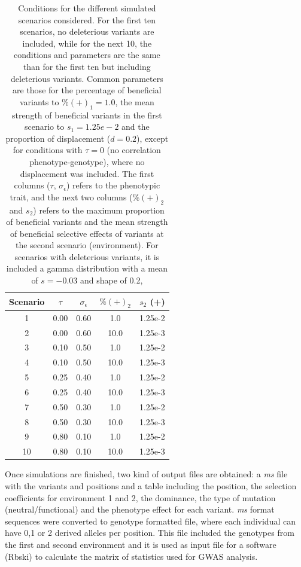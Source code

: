 \documentclass[a4paper,11pt]{article}
\begin{document}
\begin{table}[h]
\begin{center}\begin{tabular}{ccccc}
Scenario & $\tau$ & $\sigma_{\epsilon}$ & $\%(+)_2$ & $s_2$ (+)\\
\hline
1  & 0.00 & 0.60& 1.0   & 1.25e-2 \\
2  & 0.00 & 0.60 & 10.0 & 1.25e-3\\
3  & 0.10 & 0.50 & 1.0   & 1.25e-2\\
4  & 0.10 & 0.50 & 10.0 & 1.25e-3\\
5  & 0.25 & 0.40 & 1.0   & 1.25e-2\\
6  & 0.25 & 0.40 & 10.0 & 1.25e-3\\
7  & 0.50 & 0.30 & 1.0   & 1.25e-2\\
8  & 0.50 & 0.30 & 10.0 & 1.25e-3\\
9  & 0.80 & 0.10 & 1.0   & 1.25e-2\\
10 & 0.80 & 0.10 & 10.0 & 1.25e-3\\
\hline
\end{tabular} 
\caption{Conditions for the different simulated scenarios considered. For the first ten scenarios, no deleterious variants are included, while for the next 10, the conditions and parameters are the same than for the first ten  but including deleterious variants. Common parameters are those for the percentage of beneficial variants to $\%(+)_1=1.0$, the mean strength of beneficial variants in the first scenario to $s_1=1.25e-2$ and the proportion of displacement ($d=0.2$), except for conditions with $\tau=0$ (no correlation phenotype-genotype), where no displacement was included. The first columns ($\tau$, $\sigma_{\epsilon}$) refers to the phenotypic trait, and the next two columns ($\%(+)_2$ and $s_2$) refers to the maximum proportion of beneficial variants and the mean strength of beneficial selective effects of variants at the second scenario (environment). For scenarios with deleterious variants, it is included a gamma distribution with a mean of $s=-0.03$ and shape of 0.2, }
\label{tablescen}
\end{center}
\end{table}

\noindent Once simulations are finished, two kind of  output files are obtained: a \textit{ms} file with the variants and positions and a table including the position, the selection coefficients for environment 1 and 2, the dominance, the type of mutation (neutral/functional) and the phenotype effect for each variant.  \textit{ms} format sequences were converted to genotype formatted file, where each individual can have 0,1 or 2 derived alleles per position. This file included the genotypes from the first and second environment and it is used as input file for a software (Rbski) to calculate the matrix of statistics used for GWAS analysis.
\end{document}

